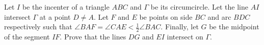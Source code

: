 Let $I$ be the incenter of a triangle $ABC$ and $\Gamma$ be its circumcircle. Let the line $AI$ intersect $\Gamma$ at a point $D \neq A$. Let $F$ and $E$ be points on side $BC$ and arc $BDC$ respectively such that $\angle BAF = \angle CAE < \frac{1}{2}\angle BAC$. Finally, let $G$ be the midpoint of the segment $IF$. Prove that the lines $DG$ and $EI$ intersect on $\Gamma$.

